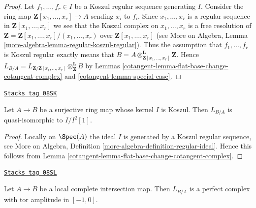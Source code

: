\begin{proof}

Let $f_1, \ldots, f_r \in I$ be a Koszul regular sequence generating $I$.
Consider the ring map $\mathbf{Z}[x_1, \ldots, x_r] \to A$ sending
$x_i$ to $f_i$. Since $x_1, \ldots, x_r$ is a regular sequence in
$\mathbf{Z}[x_1, \ldots, x_r]$ we see that the Koszul complex
on $x_1, \ldots, x_r$ is a free resolution of
$\mathbf{Z} = \mathbf{Z}[x_1, \ldots, x_r]/(x_1, \ldots, x_r)$
over $\mathbf{Z}[x_1, \ldots, x_r]$
(see More on Algebra, Lemma \ref{more-algebra-lemma-regular-koszul-regular}).
Thus the assumption that $f_1, \ldots, f_r$ is Koszul regular
exactly means that
$B = A \otimes_{\mathbf{Z}[x_1, \ldots, x_r]}^\mathbf{L} \mathbf{Z}$.
Hence
$L_{B/A} = L_{\mathbf{Z}/\mathbf{Z}[x_1, \ldots, x_r]}
\otimes_\mathbf{Z}^\mathbf{L} B$ by
Lemmas \ref{cotangent-lemma-flat-base-change-cotangent-complex} and
\ref{cotangent-lemma-special-case}.
\end{proof}

\begin{lemma}
\label{cotangent-lemma-mod-Koszul-regular-ideal}
\href{https://stacks.math.columbia.edu/tag/08SK}{\texttt{Stacks tag 08SK}}

Let $A \to B$ be a surjective ring map whose kernel $I$ is Koszul.
Then $L_{B/A}$ is quasi-isomorphic to $I/I^2[1]$.
\end{lemma}

\begin{proof}

Locally on $\Spec(A)$ the ideal $I$ is generated by a Koszul regular
sequence, see More on Algebra, Definition
\ref{more-algebra-definition-regular-ideal}.
Hence this follows from
Lemma \ref{cotangent-lemma-flat-base-change-cotangent-complex}.
\end{proof}

\begin{proposition}
\label{cotangent-proposition-cotangent-complex-local-complete-intersection}
\href{https://stacks.math.columbia.edu/tag/08SL}{\texttt{Stacks tag 08SL}}

Let $A \to B$ be a local complete intersection map.
Then $L_{B/A}$ is a perfect complex with tor amplitude in $[-1, 0]$.
\end{proposition}

